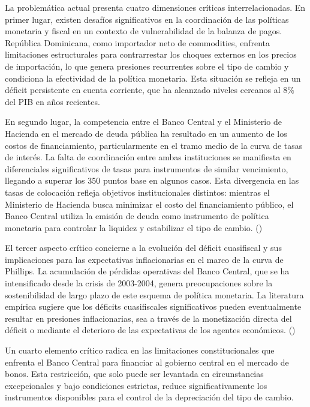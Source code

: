 \documentclass[
  man,
  longtable,
  nolmodern,
  notxfonts,
  notimes,
  colorlinks=true,linkcolor=blue,citecolor=blue,urlcolor=blue]{apa7}
\begin{document}
La problemática actual presenta cuatro dimensiones críticas
interrelacionadas. En primer lugar, existen desafíos significativos en
la coordinación de las políticas monetaria y fiscal en un contexto de
vulnerabilidad de la balanza de pagos. República Dominicana, como
importador neto de commodities, enfrenta limitaciones estructurales para
contrarrestar los choques externos en los precios de importación, lo que
genera presiones recurrentes sobre el tipo de cambio y condiciona la
efectividad de la política monetaria. Esta situación se refleja en un
déficit persistente en cuenta corriente, que ha alcanzado niveles
cercanos al 8\% del PIB en años recientes.

En segundo lugar, la competencia entre el Banco Central y el Ministerio
de Hacienda en el mercado de deuda pública ha resultado en un aumento de
los costos de financiamiento, particularmente en el tramo medio de la
curva de tasas de interés. La falta de coordinación entre ambas
instituciones se manifiesta en diferenciales significativos de tasas
para instrumentos de similar vencimiento, llegando a superar los 350
puntos base en algunos casos. Esta divergencia en las tasas de
colocación refleja objetivos institucionales distintos: mientras el
Ministerio de Hacienda busca minimizar el costo del financiamiento
público, el Banco Central utiliza la emisión de deuda como instrumento
de política monetaria para controlar la liquidez y estabilizar el tipo
de cambio. ()

El tercer aspecto crítico concierne a la evolución del déficit
cuasifiscal y sus implicaciones para las expectativas inflacionarias en
el marco de la curva de Phillips. La acumulación de pérdidas operativas
del Banco Central, que se ha intensificado desde la crisis de 2003-2004,
genera preocupaciones sobre la sostenibilidad de largo plazo de este
esquema de política monetaria. La literatura empírica sugiere que los
déficits cuasifiscales significativos pueden eventualmente resultar en
presiones inflacionarias, sea a través de la monetización directa del
déficit o mediante el deterioro de las expectativas de los agentes
económicos. ()

Un cuarto elemento crítico radica en las limitaciones constitucionales
que enfrenta el Banco Central para financiar al gobierno central en el
mercado de bonos. Esta restricción, que solo puede ser levantada en
circunstancias excepcionales y bajo condiciones estrictas, reduce
significativamente los instrumentos disponibles para el control de la
depreciación del tipo de cambio.
\end{document}
